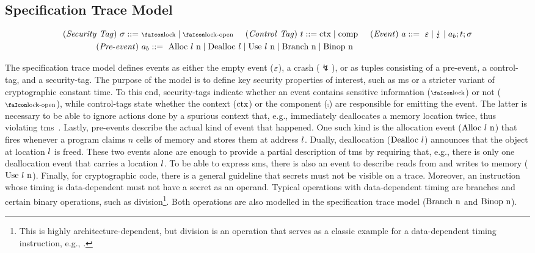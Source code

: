 \documentclass[utf8,acmsmall,review,screen,dvipsnames,anonymous]{acmart}
\begin{document}
\subsection{Specification Trace Model}\label{subsec:propdefs}

\begin{gather*}
  \begin{aligned}
  \mi{(Security\ Tag)}~\sigma\bnfdef&\ \lock \mid \unlock\hspace{0.5cm}
  \mi{(Control\ Tag)}~\sandboxtag\bnfdef \ctx\mid\comp\hspace{0.5cm}
  \mi{(Event)}~\event\bnfdef\ \emptyevent \mid \lightning \mid \event[_{b}];\sandboxtag;\sigma \\
  \mi{(Pre\text{-}event)}&~\event[_{b}]\bnfdef\ \ev{Alloc\ \loc\ n} \mid \ev{Dealloc\ \loc} \mid \ev{Use\ \loc\ n} \mid \ev{Branch\ n} \mid \ev{Binop\ n} \\
  \end{aligned}
\end{gather*}

The specification trace model defines events as either the empty event ($\varepsilon$), a crash ($\lightning$), or as tuples consisting of a pre-event, a control-tag, and a security-tag.
The purpose of the model is to define key security properties of interest, such as \gls*{ms} or a stricter variant of cryptographic constant time.
To this end, security-tags indicate whether an event contains sensitive information ($\lock$) or not ($\unlock$), while control-tags state whether the context ($\text{ctx}$) or the component ($\comp$) are responsible for emitting the event.
The latter is necessary to be able to ignore actions done by a spurious context that, e.g., immediately deallocates a memory location twice, thus violating \gls*{tms}~\cite{nagarakatte2010cets}.
Lastly, pre-events describe the actual kind of event that happened.
One such kind is the allocation event ($\text{Alloc\ \ensuremath l\ n}$) that fires whenever a program claims $n$ cells of memory and stores them at address $l$.
Dually, deallocation ($\text{Dealloc\ \ensuremath l}$) announces that the object at location $l$ is freed.
These two events alone are enough to provide a partial description of \gls*{tms} by requiring that, e.g., there is only one deallocation event that carries a location $l$.
To be able to express \gls*{sms}, there is also an event to describe reads from and writes to memory ($\text{Use\ \ensuremath l\ n}$).
Finally, for cryptographic code, there is a general guideline that secrets must not be visible on a trace.
Moreover, an instruction whose timing is data-dependent must not have a secret as an operand.
Typical operations with data-dependent timing are branches and certain binary operations, such as division\footnote{This is highly architecture-dependent, but division is an operation that serves as a classic example for a data-dependent timing instruction, e.g., \cite[p.~755]{arm-refman}.}.
Both operations are also modelled in the specification trace model ($\ev{Branch\ n}$ and $\text{Binop\ n}$).
\end{document}
